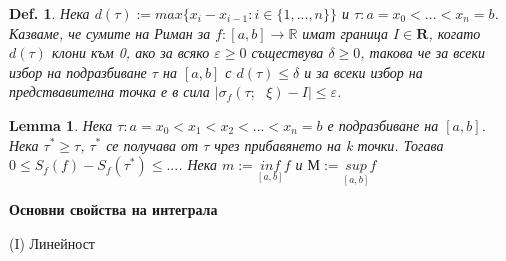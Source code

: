 \documentclass[12pt]{article}
\newtheorem{definition}{Def.}
\newtheorem{lemma}{Lemma}
\newcommand{\spc}{\text{ }}
\begin{document}
	\begin{definition}
		Нека $d\left(\tau\right) := max\{x_{i}-x_{i-1} : i\in\{1,...,n\}\}$ и $\tau : a=x_{0}<...<x_{n}=b$. Казваме, че сумите на Риман за $f: \left[a, b\right] \rightarrow \mathbb{R}$ имат граница $I\in\mathbf{R}$, когато $d\left(\tau\right)$ клони към 0, ако за всяко $\varepsilon\geq 0$ съществува $\delta\geq 0$, такова че за всеки избор на подразбиване $\tau$ на $\left[a, b\right]$ с $d\left(\tau\right)\leq\delta$ и за всеки избор на предствавителна точка е в сила $|\sigma_{f}\left(\tau;\spc\xi\right)-I|\leq\varepsilon$.
	\end{definition}
	
	\begin{lemma}
		Нека $\tau : a=x_{0}<x_{1}<x_{2}<...<x_{n}=b$ е подразбиване на $\left[a, b\right]$. Нека $\tau^{*}\geq\tau$, $\tau^{*}$ се получава от $\tau$ чрез прибавянето на k точки. Тогава $0\leq S_{f}\left(f\right)-S_{f}\left(\tau^{*}\right)\leq...$.
		Нека $m := \underset{\left[a, b\right]}{inf} f$ и $М := \underset{\left[a, b\right]}{sup} f$
	\end{lemma}
	
	
	\begin{center}
		\textbf{Основни свойства на интеграла}
	\end{center}
	(I) Линейност
	
\end{document}
